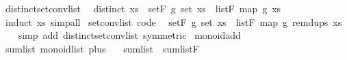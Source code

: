 \begin{isabellebody}
\ distinct{\isacharunderscore}{\kern0pt}set{\isacharunderscore}{\kern0pt}conv{\isacharunderscore}{\kern0pt}list{\isacharcolon}{\kern0pt}\isanewline
\ \ {\isachardoublequoteopen}distinct\ xs\ {\isasymLongrightarrow}\ set{\isachardot}{\kern0pt}F\ g\ {\isacharparenleft}{\kern0pt}set\ xs{\isacharparenright}{\kern0pt}\ {\isacharequal}{\kern0pt}\ list{\isachardot}{\kern0pt}F\ {\isacharparenleft}{\kern0pt}map\ g\ xs{\isacharparenright}{\kern0pt}{\isachardoublequoteclose}\isanewline
%
\isadelimproof
\ \ %
\endisadelimproof
%
\isatagproof
{}\isamarkupfalse%
\ {\isacharparenleft}{\kern0pt}induct\ xs{\isacharparenright}{\kern0pt}\ simp{\isacharunderscore}{\kern0pt}all%
\endisatagproof
{\isafoldproof}%
%
\isadelimproof
\isanewline
%
\endisadelimproof
\isanewline
{}\isamarkupfalse%
\ set{\isacharunderscore}{\kern0pt}conv{\isacharunderscore}{\kern0pt}list\ {\isacharbrackleft}{\kern0pt}code{\isacharbrackright}{\kern0pt}{\isacharcolon}{\kern0pt}\isanewline
\ \ {\isachardoublequoteopen}set{\isachardot}{\kern0pt}F\ g\ {\isacharparenleft}{\kern0pt}set\ xs{\isacharparenright}{\kern0pt}\ {\isacharequal}{\kern0pt}\ list{\isachardot}{\kern0pt}F\ {\isacharparenleft}{\kern0pt}map\ g\ {\isacharparenleft}{\kern0pt}remdups\ xs{\isacharparenright}{\kern0pt}{\isacharparenright}{\kern0pt}{\isachardoublequoteclose}\isanewline
%
\isadelimproof
\ \ %
\endisadelimproof
%
\isatagproof
{}\isamarkupfalse%
\ {\isacharparenleft}{\kern0pt}simp\ add{\isacharcolon}{\kern0pt}\ distinct{\isacharunderscore}{\kern0pt}set{\isacharunderscore}{\kern0pt}conv{\isacharunderscore}{\kern0pt}list\ {\isacharbrackleft}{\kern0pt}symmetric{\isacharbrackright}{\kern0pt}{\isacharparenright}{\kern0pt}%
\endisatagproof
{\isafoldproof}%
%
\isadelimproof
\isanewline
%
\endisadelimproof
\isanewline
{}\isamarkupfalse%
%
\isadelimdocument
%
\endisadelimdocument
%
\isatagdocument
%
\isamarkuptrue%
%
\endisatagdocument
{\isafolddocument}%
%
\isadelimdocument
%
\endisadelimdocument
{}\isamarkupfalse%
\ monoid{\isacharunderscore}{\kern0pt}add\isanewline
{}\isanewline
\isanewline
{}\isamarkupfalse%
\ sum{\isacharunderscore}{\kern0pt}list{\isacharcolon}{\kern0pt}\ monoid{\isacharunderscore}{\kern0pt}list\ plus\ {}\isanewline
{}\isanewline
\ \ sum{\isacharunderscore}{\kern0pt}list\ {\isacharequal}{\kern0pt}\ sum{\isacharunderscore}{\kern0pt}list{\isachardot}{\kern0pt}F%
\isadelimproof
\ %
\endisadelimproof
%
\isatagproof
\isacommand{{\isachardot}{\kern0pt}{\isachardot}{\kern0pt}}\isamarkupfalse%

\end{isabellebody}
